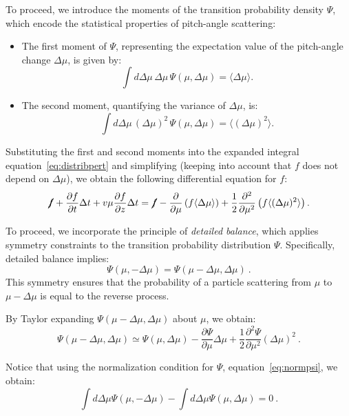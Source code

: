 To proceed, we introduce the moments of the transition probability density \( \Psi \), which encode the statistical properties of pitch-angle scattering:
%
\begin{itemize}
\item The first moment of \( \Psi \), representing the expectation value of the pitch-angle change \( \Delta \mu \), is given by:
\[
\int d\Delta \mu \, \Delta \mu \, \Psi(\mu, \Delta \mu) = \langle \Delta \mu \rangle.
\]
\item The second moment, quantifying the variance of \( \Delta \mu \), is:
\[
\int d\Delta \mu \, (\Delta \mu)^2 \, \Psi(\mu, \Delta \mu) = \langle (\Delta \mu)^2 \rangle.
\]
\end{itemize}

Substituting the first and second moments into the expanded integral equation~\eqref{eq:distribpert} and simplifying (keeping into account that  \( f \) does not depend on \( \Delta \mu \)), we obtain the following differential equation for \( f \):
%
\begin{equation}\label{eq:diffftemp}
\cancel{f} + \frac{\partial f}{\partial t} \Delta t + v \mu \frac{\partial f}{\partial z} \Delta t = 
\cancel{f} -\frac{\partial}{\partial \mu} \left( f \langle \Delta \mu \rangle \right) + \frac{1}{2} \frac{\partial^2}{\partial \mu^2} \left( f \langle (\Delta \mu)^2 \rangle \right).
\end{equation}

To proceed, we incorporate the principle of \emph{detailed balance}, which applies symmetry constraints to the transition probability distribution \( \Psi \). 
%
Specifically, detailed balance implies:
\begin{equation}\label{eq:detbalance}
\Psi(\mu, -\Delta \mu) = \Psi(\mu - \Delta \mu, \Delta \mu)~.
\end{equation}
%
This symmetry ensures that the probability of a particle scattering from \( \mu \) to \( \mu - \Delta \mu \) is equal to the reverse process. 

By Taylor expanding \( \Psi(\mu - \Delta \mu, \Delta \mu) \) about \( \mu \), we obtain:
\begin{equation}
\Psi(\mu - \Delta \mu, \Delta \mu) \simeq \Psi(\mu, \Delta \mu) - \frac{\partial \Psi}{\partial \mu} \Delta \mu + \frac{1}{2} \frac{\partial^2 \Psi}{\partial \mu^2} (\Delta \mu)^2~.
\end{equation}

Notice that using the normalization condition for \( \Psi \), equation~\eqref{eq:normpsi}, we obtain:
\begin{equation}
\int d\Delta \mu \Psi(\mu, -\Delta \mu) - \int d\Delta \mu \Psi(\mu, \Delta \mu) = 0~.
\end{equation}

